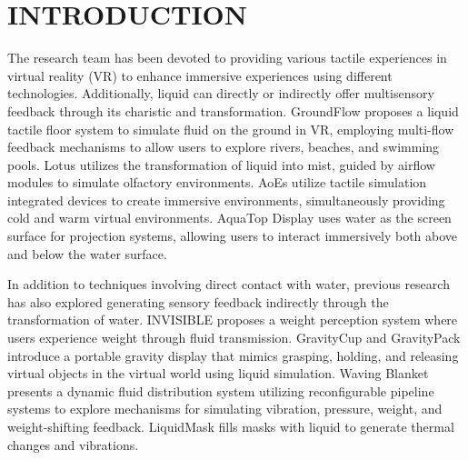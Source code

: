 \documentclass[manuscript]{acmart} %
\begin{document}
\section{INTRODUCTION}
The research team has been devoted to providing various tactile experiences in virtual reality (VR) to enhance immersive experiences using different technologies. Additionally, liquid can directly or indirectly offer multisensory feedback through its charistic and transformation. GroundFlow \cite{han2023groundflow} proposes a liquid tactile floor system to simulate fluid on the ground in VR, employing multi-flow feedback mechanisms to allow users to explore rivers, beaches, and swimming pools. Lotus \cite{chen2018lotus} utilizes the transformation of liquid into mist, guided by airflow modules to simulate olfactory environments. AoEs \cite{han2017aoes} utilize tactile simulation integrated devices to create immersive environments, simultaneously providing cold and warm virtual environments. AquaTop Display \cite{matoba2013aquatop} uses water as the screen surface for projection systems, allowing users to interact immersively both above and below the water surface. 

In addition to techniques involving direct contact with water, previous research has also explored generating sensory feedback indirectly through the transformation of water. INVISIBLE \cite{nakano2006invisible} proposes a weight perception system where users experience weight through fluid transmission. GravityCup \cite{cheng2018gravitycup} and GravityPack \cite{chen2022gravitypack} introduce a portable gravity display that mimics grasping, holding, and releasing virtual objects in the virtual world using liquid simulation. Waving Blanket \cite{han2022waving} presents a dynamic fluid distribution system utilizing reconfigurable pipeline systems to explore mechanisms for simulating vibration, pressure, weight, and weight-shifting feedback. LiquidMask \cite{liao2019liquidmask} fills masks with liquid to generate thermal changes and vibrations.
\end{document}
